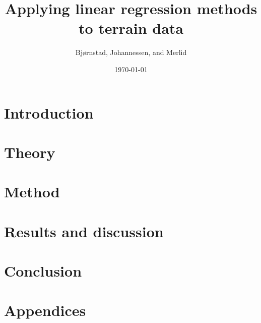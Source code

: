 \documentclass[aps,rmp,reprint,amsmath,amssymb,twocolumn,floatfix]{revtex4-1}
\begin{document}
\title{Applying linear regression methods to terrain data}

\author{Bjørnstad, Johannessen, and Merlid}
\date{\today}


\begin{abstract}

\end{abstract}
\maketitle

\tableofcontents

\section{Introduction}
\label{sec:introduction}

\section{Theory}


\section{Method}


\section{Results and discussion}


%

\section{Conclusion}


\newpage
{} %

\clearpage
\appendix
\section{Appendices}
\label{appendix}

\end{document}
